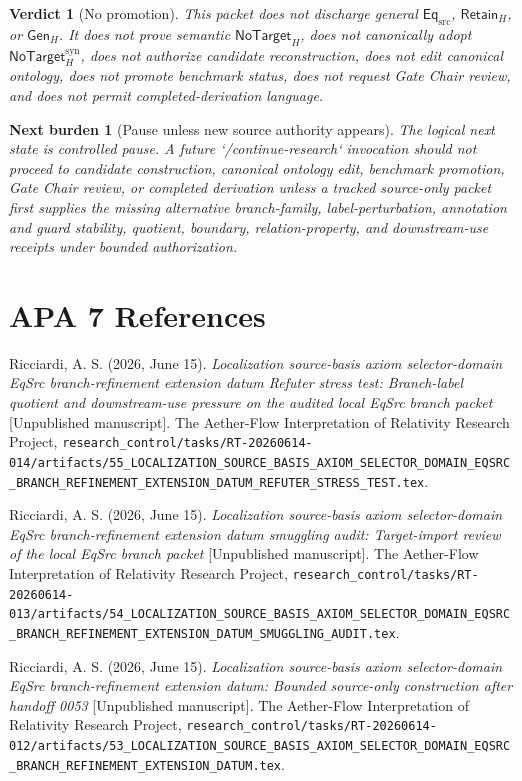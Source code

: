 \documentclass[11pt]{article}
\newcommand{\EqSrc}{\mathsf{Eq}_{\mathrm{src}}}
\newcommand{\RetainH}{\mathsf{Retain}_{H}}
\newcommand{\GenH}{\mathsf{Gen}_{H}}
\newcommand{\NoTargetH}{\mathsf{NoTarget}_{H}}
\newcommand{\NoTargetSyn}{\mathsf{NoTarget}_{H}^{\mathrm{syn}}}
\newtheorem{verdict}{Verdict}
\newtheorem{nextburden}{Next burden}
\begin{document}
\begin{verdict}[No promotion]
This packet does not discharge general \(\EqSrc\), \(\RetainH\), or
\(\GenH\). It does not prove semantic \(\NoTargetH\), does not
canonically adopt \(\NoTargetSyn\), does not authorize candidate
reconstruction, does not edit canonical ontology, does not promote
benchmark status, does not request Gate Chair review, and does not permit
completed-derivation language.
\end{verdict}

\begin{nextburden}[Pause unless new source authority appears]
The logical next state is controlled pause. A future `/continue-research`
invocation should not proceed to candidate construction, canonical
ontology edit, benchmark promotion, Gate Chair review, or completed
derivation unless a tracked source-only packet first supplies the missing
alternative branch-family, label-perturbation, annotation and guard
stability, quotient, boundary, relation-property, and downstream-use
receipts under bounded authorization.
\end{nextburden}

\section*{APA 7 References}

Ricciardi, A. S. (2026, June 15). \emph{Localization source-basis axiom
selector-domain EqSrc branch-refinement extension datum Refuter stress
test: Branch-label quotient and downstream-use pressure on the audited
local EqSrc branch packet} [Unpublished manuscript]. The Aether-Flow
Interpretation of Relativity Research Project,
\texttt{research\_control/tasks/RT-20260614-014/artifacts/55\_LOCALIZATION\_SOURCE\_BASIS\_AXIOM\_SELECTOR\_DOMAIN\_EQSRC\_BRANCH\_REFINEMENT\_EXTENSION\_DATUM\_REFUTER\_STRESS\_TEST.tex}.

Ricciardi, A. S. (2026, June 15). \emph{Localization source-basis axiom
selector-domain EqSrc branch-refinement extension datum smuggling audit:
Target-import review of the local EqSrc branch packet} [Unpublished
manuscript]. The Aether-Flow Interpretation of Relativity Research
Project,
\texttt{research\_control/tasks/RT-20260614-013/artifacts/54\_LOCALIZATION\_SOURCE\_BASIS\_AXIOM\_SELECTOR\_DOMAIN\_EQSRC\_BRANCH\_REFINEMENT\_EXTENSION\_DATUM\_SMUGGLING\_AUDIT.tex}.

Ricciardi, A. S. (2026, June 15). \emph{Localization source-basis axiom
selector-domain EqSrc branch-refinement extension datum: Bounded
source-only construction after handoff 0053} [Unpublished manuscript].
The Aether-Flow Interpretation of Relativity Research Project,
\texttt{research\_control/tasks/RT-20260614-012/artifacts/53\_LOCALIZATION\_SOURCE\_BASIS\_AXIOM\_SELECTOR\_DOMAIN\_EQSRC\_BRANCH\_REFINEMENT\_EXTENSION\_DATUM.tex}.
\end{document}
